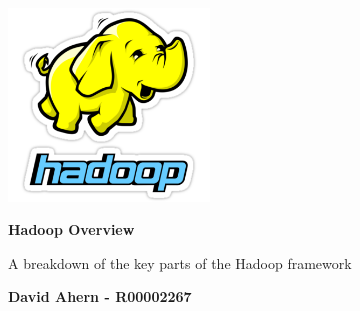 \begin{titlepage}
    \begin{center}
    	\includegraphics[width=0.4\textwidth]{images/hadoop.png}
    	
        \vspace*{1cm}
        
        \textbf{Hadoop Overview}
        
        \vspace{0.5cm}
        A breakdown of the key parts of the Hadoop framework
        
        \vspace{1.5cm}
        
        \textbf{David Ahern - R00002267}
        
    \end{center}
\end{titlepage}